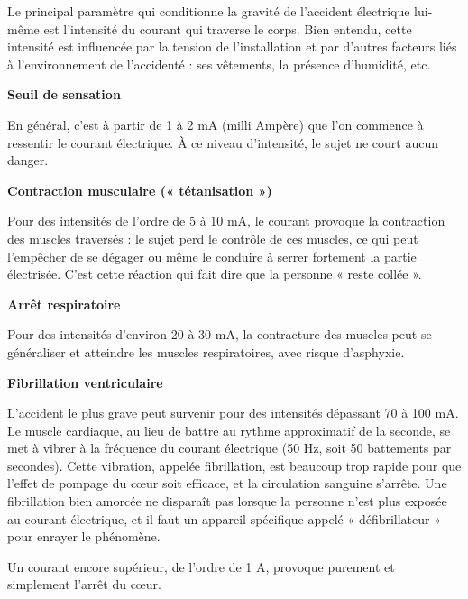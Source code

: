 Le principal paramètre qui conditionne la gravité de l’accident électrique lui-même est l’intensité du courant qui traverse le corps. Bien entendu, cette intensité est influencée par la tension de l’installation et par d’autres facteurs liés à l’environnement de l’accidenté : ses vêtements, la présence d’humidité, etc.
\vspace{0.3cm}

\textbf{Seuil de sensation}
\vspace{0.3cm}

En général, c’est à partir de 1 à 2 mA (milli Ampère) que l’on commence à ressentir le courant électrique. À ce niveau d’intensité, le sujet ne court aucun danger.

\vspace{0.3cm}
\textbf{Contraction musculaire (« tétanisation »)}
\vspace{0.3cm}

Pour des intensités de l’ordre de 5 à 10 mA, le courant provoque la contraction des muscles traversés : le sujet perd le contrôle de ces muscles, ce qui peut l’empêcher de se dégager ou même le conduire à serrer fortement la partie électrisée. C’est cette réaction qui fait dire que la personne « reste collée ».

\vspace{0.3cm}
\textbf{Arrêt respiratoire}
\vspace{0.3cm}

Pour des intensités d’environ 20 à 30 mA, la contracture des muscles peut se généraliser et atteindre les muscles respiratoires, avec risque d’asphyxie.

\vspace{0.3cm}
\textbf{Fibrillation ventriculaire}
\vspace{0.3cm}

L’accident le plus grave peut survenir pour des intensités dépassant 70 à 100 mA. Le muscle cardiaque, au lieu de battre au rythme approximatif de la seconde, se met à vibrer à la fréquence du courant électrique (50 Hz, soit 50 battements par secondes). Cette vibration, appelée fibrillation, est beaucoup trop rapide pour que l’effet de pompage du cœur soit efficace, et la circulation sanguine s’arrête. Une fibrillation bien amorcée ne disparaît pas lorsque la personne n’est plus exposée au courant électrique, et il faut un appareil spécifique appelé « défibrillateur » pour enrayer le phénomène.

Un courant encore supérieur, de l’ordre de 1 A, provoque purement et simplement l’arrêt du cœur.

